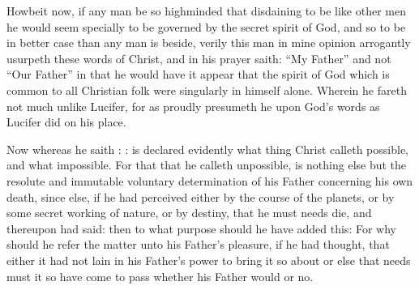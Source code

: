 \documentclass[a5paper]{scrbook}
\begin{document}
	Howbeit now, if any man be so highminded that disdaining to be like other men he would seem specially to be governed by the secret spirit of God, and so to be in better case than any man is beside, verily this man in mine opinion arrogantly usurpeth these words of Christ, and in his prayer saith: ``My Father'' and not ``Our Father'' in that he would have it appear that the spirit of God which is common to all Christian folk were singularly in himself alone. Wherein he fareth not much unlike Lucifer, for as proudly presumeth he upon God's words as Lucifer did on his place.
	
	Now whereas he saith : : is declared evidently what thing Christ calleth possible, and what impossible. For that that he calleth unpossible, is nothing else but the resolute and immutable voluntary determination of his Father concerning his own death, since else, if he had perceived either by the course of the planets, or by some secret working of nature, or by destiny, that he must needs die, and thereupon had said:  then to what purpose should he have added this:  For why should he refer the matter unto his Father's pleasure, if he had thought, that either it had not lain in his Father's power to bring it so about or else that needs must it so have come to pass whether his Father would or no.
	
\end{document}
